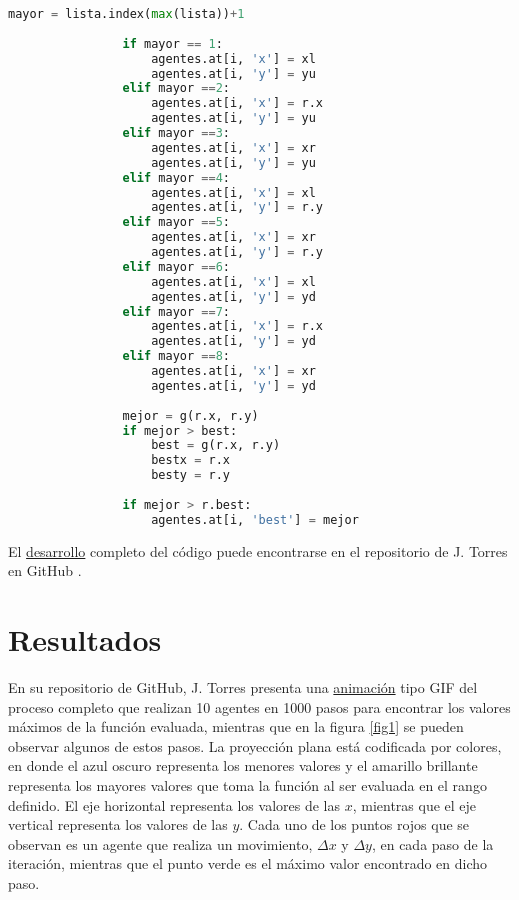 \documentclass{article}
\begin{document}
\begin{lstlisting}[caption= Maximizaci\'on de la Funci\'on, label=codigo7, language=Python]
                mayor = lista.index(max(lista))+1   
                       
                if mayor == 1:
                    agentes.at[i, 'x'] = xl
                    agentes.at[i, 'y'] = yu
                elif mayor ==2:
                    agentes.at[i, 'x'] = r.x
                    agentes.at[i, 'y'] = yu
                elif mayor ==3:
                    agentes.at[i, 'x'] = xr
                    agentes.at[i, 'y'] = yu
                elif mayor ==4:
                    agentes.at[i, 'x'] = xl
                    agentes.at[i, 'y'] = r.y
                elif mayor ==5:
                    agentes.at[i, 'x'] = xr
                    agentes.at[i, 'y'] = r.y
                elif mayor ==6:
                    agentes.at[i, 'x'] = xl
                    agentes.at[i, 'y'] = yd
                elif mayor ==7:
                    agentes.at[i, 'x'] = r.x
                    agentes.at[i, 'y'] = yd
                elif mayor ==8:
                    agentes.at[i, 'x'] = xr
                    agentes.at[i, 'y'] = yd
                
                mejor = g(r.x, r.y)
                if mejor > best:
                    best = g(r.x, r.y)
                    bestx = r.x
                    besty = r.y
                
                if mejor > r.best:
                    agentes.at[i, 'best'] = mejor
\end{lstlisting}

El \href{https://github.com/FeroxDeitas/Simulacion-Nano/blob/main/Tareas/P7/busqueda_local.py}{desarrollo} completo del c\'odigo puede encontrarse en el repositorio de J. Torres en GitHub \cite{jorge1}.

\section{Resultados}\label{res}
En su repositorio de GitHub, J. Torres presenta una \href{https://github.com/FeroxDeitas/Simulacion-Nano/blob/main/Tareas/P7/maximizar.gif}{animaci\'on} tipo GIF del proceso completo que realizan 10 agentes en 1000 pasos para encontrar los valores m\'aximos de la funci\'on evaluada, mientras que en la figura \ref{fig1} se pueden observar algunos de estos pasos. La proyecci\'on plana est\'a codificada por colores, en donde el azul oscuro representa los menores valores y el amarillo brillante representa los mayores valores que toma la funci\'on al ser evaluada en el rango definido. El eje horizontal representa los valores de las $x$, mientras que el eje vertical representa los valores de las $y$. Cada uno de los puntos rojos que se observan es un agente que realiza un movimiento, $\Delta x$ y $\Delta y$, en cada paso de la iteraci\'on, mientras que el punto verde es el m\'aximo valor encontrado en dicho paso. 
\end{document}
